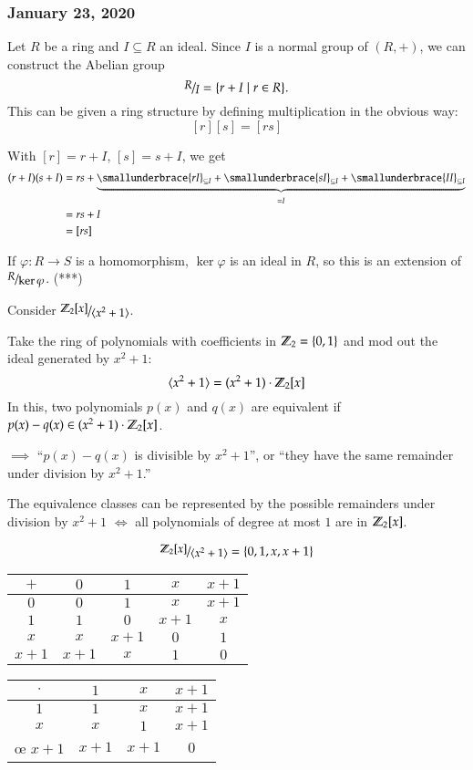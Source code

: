 \subsubsection*{January 23, 2020}

Let $R$ be a ring and $I\subseteq R$ an ideal. Since $I$ is a normal group of $(R, +)$, we can construct the Abelian group
\[\nicefrac{R}{I} = \{r+I\mid r\in R\}.\]
This can be given a ring structure by defining multiplication in the obvious way: 
\[[r][s] = [rs]\]

With $[r] = r+I$, $[s] = s+I$, we get
\begin{align*}
	(r+I)(s+I)&=rs+\underbrace{\smallunderbrace{rI}_{\subseteq I}+\smallunderbrace{sI}_{\subseteq I}+\smallunderbrace{II}_{\subseteq I}}_{=I} \\
	&= rs + I \\
	&= [rs]
\end{align*}

\example If $\varphi: R\to S$ is a homomorphism, $\ker \varphi$ is an ideal in $R$, so this is an extension of $\nicefrac{R}{\ker \varphi}$. (***)

Consider $\nicefrac{\Z_2[x]}{\langle x^2+1 \rangle}$. 

Take the ring of polynomials with coefficients in $\mathbb{Z}_2=\{0,1\}$ and mod out the ideal generated by $x^2 + 1$: 
\[\langle x^2 + 1 \rangle = (x^2+1)\cdot \mathbb{Z}_2[x]\]
In this, two polynomials $p(x)$ and $q(x)$ are equivalent if $p(x)-q(x)\in(x^2+1)\cdot \mathbb{Z}_2[x]$. 

$\implies$ ``$p(x) - q(x)$ is divisible by $x^2+1$'', or ``they have the same remainder under division by $x^2+1$.''

The equivalence classes can be represented by the possible remainders under division by $x^2+1$ $\iff$ all polynomials of degree at most $1$ are in $\mathbb{Z}_2[x]$. 

\[\nicefrac{\Z_2[x]}{\langle x^2+1 \rangle} = \{0, 1, x, x+1\}\]
\begin{center}
\begin{tabular}{c|cccc}
$+$   & $0$   & $1$   & $x$   & $x+1$ \\ \hline
$0$   & $0$   & $1$   & $x$   & $x+1$ \\
$1$   & $1$   & $0$   & $x+1$ & $x$   \\
$x$   & $x$   & $x+1$ & $0$   & $1$   \\
$x+1$ & $x+1$ & $x$   & $1$   & $0$  
\end{tabular}
\hspace{2em}
\begin{tabular}{c|ccc}
$\cdot$ & $1$   & $x$   & $x+1$ \\ \hline
$1$     & $1$   & $x$   & $x+1$ \\
$x$     & $x$   & $1$   & $x+1$ \\œ
$x+1$   & $x+1$ & $x+1$ & $0$  
\end{tabular}
\end{center}

